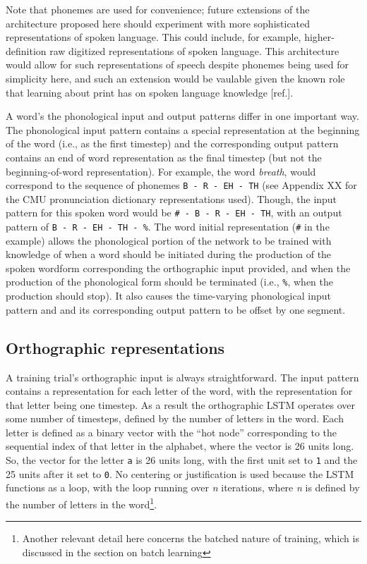 \documentclass[
  american,
  ,man,floatsintext]{apa6}
\begin{document}
Note that phonemes are used for convenience; future extensions of the architecture proposed here should experiment with more sophisticated representations of spoken language. This could include, for example, higher-definition raw digitized representations of spoken language. This architecture would allow for such representations of speech despite phonemes being used for simplicity here, and such an extension would be vaulable given the known role that learning about print has on spoken language knowledge {[}ref.{]}.

A word's the phonological input and output patterns differ in one important way. The phonological input pattern contains a special representation at the beginning of the word (i.e., as the first timestep) and the corresponding output pattern contains an end of word representation as the final timestep (but not the beginning-of-word representation). For example, the word \emph{breath}, would correspond to the sequence of phonemes \texttt{B\ -\ R\ -\ EH\ -\ TH} (see Appendix XX for the CMU pronunciation dictionary representations used). Though, the input pattern for this spoken word would be \texttt{\#\ -\ B\ -\ R\ -\ EH\ -\ TH}, with an output pattern of \texttt{B\ -\ R\ -\ EH\ -\ TH\ -\ \%}. The word initial representation (\texttt{\#} in the example) allows the phonological portion of the network to be trained with knowledge of when a word should be initiated during the production of the spoken wordform corresponding the orthographic input provided, and when the production of the phonological form should be terminated (i.e., \texttt{\%}, when the production should stop). It also causes the time-varying phonological input pattern and and its corresponding output pattern to be offset by one segment.

\hypertarget{orthographic-representations}{%
\subsection{Orthographic representations}\label{orthographic-representations}}

A training trial's orthographic input is always straightforward. The input pattern contains a representation for each letter of the word, with the representation for that letter being one timestep. As a result the orthographic LSTM operates over some number of timesteps, defined by the number of letters in the word. Each letter is defined as a binary vector with the ``hot node'' corresponding to the sequential index of that letter in the alphabet, where the vector is 26 units long. So, the vector for the letter \texttt{a} is 26 units long, with the first unit set to \texttt{1} and the 25 units after it set to \texttt{0}. No centering or justification is used because the LSTM functions as a loop, with the loop running over \emph{n} iterations, where \emph{n} is defined by the number of letters in the word\footnote{Another relevant detail here concerns the batched nature of training, which is discussed in the section on batch learning}.
\end{document}
